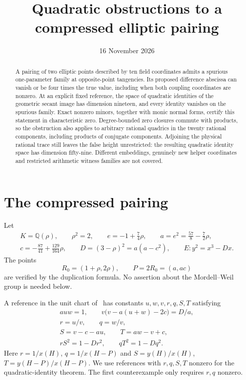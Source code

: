 \documentclass[11pt,a4paper]{article}
\title{Quadratic obstructions to a compressed elliptic pairing}
\author{}\date{16 November 2026}
\newcommand{\Q}{\mathbb Q}\newcommand{\Z}{\mathbb Z}
\begin{document}
\maketitle
\begin{abstract}
A pairing of two elliptic points described by ten field coordinates
admits a spurious one-parameter family at opposite-point tangencies.
Its proposed difference abscissa can vanish or be four times the true
value, including when both coupling coordinates are nonzero.
At an explicit fixed reference, the space of quadratic identities of
the geometric secant image has dimension nineteen, and every identity
vanishes on the spurious family. Exact nonzero minors, together with
monic normal forms, certify this statement in characteristic zero.
Degree-bounded zero closures commute with products, so the obstruction
also applies to arbitrary rational quadrics in the twenty rational
components, including products of conjugate components. Adjoining the
physical rational trace still leaves the false height unrestricted:
the resulting quadratic identity space has dimension fifty-nine.
Different embeddings, genuinely new helper coordinates and restricted
arithmetic witness families are not covered.
\end{abstract}

\section{The compressed pairing}
Let
\begin{equation}\label{eq:constants}
\begin{gathered}
 K=\Q(\rho),\qquad \rho^2=2,\qquad
 e=-1+\frac74\rho,\qquad
 a=e^2=\frac{57}{8}-\frac72\rho,\\
 c=-\frac{87}{41}+\frac{129}{164}\rho,\qquad
 D=(3-\rho)^2=a(a-c^2),\qquad E:y^2=x^3-Dx.
\end{gathered}
\end{equation}
The points
\[
 R_0=(1+\rho,2\rho),\qquad P=2R_0=(a,ac)
\]
are verified by the duplication formula. No assertion about the
Mordell--Weil group is needed below.

A reference in the unit chart of~\cite{Reference} has constants
$u,w,v,r,q,S,T$ satisfying
\begin{equation}\label{eq:reference}
\begin{gathered}
 auw=1,\qquad v\bigl(v-a(u+w)-2c\bigr)=D/a,\\
 r=u/v,\qquad q=w/v,\\
 S=v-c-au,\qquad T=aw-v+c,\\
 rS^2=1-Dr^2,\qquad qT^2=1-Dq^2.
\end{gathered}
\end{equation}
Here $r=1/x(H)$, $q=1/x(H-P)$ and $S=y(H)/x(H)$,
$T=y(H-P)/x(H-P)$. We use references with $r,q,S,T$ nonzero
for the quadratic-identity theorem. The first counterexample only
requires $r,q$ nonzero.
\end{document}
